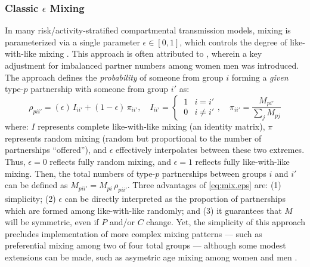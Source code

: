 \subsubsection{Classic $\epsilon$ Mixing}\label{model.par.mix.eps}
In many risk/activity-stratified compartmental transmission models,
mixing is parameterized via a single parameter $\epsilon \in [0,1]$,
which controls the degree of like-with-like mixing \cite{Nold1980}.
This approach is often attributed to \cite{Garnett1994},
wherein a key adjustment for imbalanced partner numbers among women \vs men was introduced.
The approach defines the \emph{probability} of
someone from group $i$ forming a \emph{given} type-$p$ partnership with someone from group $i'$ as:
\begin{equation}\label{eq:mix.eps}
  \rho_{pii'} = (\epsilon)\,I_{ii'} + (1 - \epsilon)\,\pi_{ii'},
  \quad I_{ii'} = \begin{cases} ~1 & i = i'\\ ~0 & i \ne i' \end{cases},
  \quad \pi_{ii'} = \frac{M_{pi'}}{\sum_{j}M_{pj}}
\end{equation} where:
$I$ represents complete like-with-like mixing (an identity matrix),
$\pi$ represents random mixing (random but proportional to the number of partnerships ``offered''),
and $\epsilon$ effectively interpolates between these two extremes.
Thus, $\epsilon = 0$ reflects fully random mixing,
and $\epsilon = 1$ reflects fully like-with-like mixing.
Then, the total numbers of type-$p$ partnerships between groups $i$ and $i'$ can be
defined as $M_{pii'} = M_{pi}\,\rho_{pii'}$.
Three advantages of \eqref{eq:mix.eps} are:
(1) simplicity;
(2) $\epsilon$ can be directly interpreted as the proportion of partnerships
which are formed among like-with-like \vs randomly; and
(3) it guarantees that $M$ will be symmetric, even if $P$ and/or $C$ change.
Yet, the simplicity of this approach precludes implementation of more complex mixing patterns
--- such as preferential mixing among two of four total groups ---
although some modest extensions can be made,
such as asymetric age mixing among women and men \cite{Cremin2013}.
